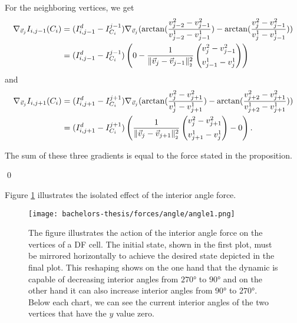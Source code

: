 \begin{proposition}
	For the neighboring vertices, we get 
	\begin{align*}
		\nabla_{\vec{v}_j}  I_{i, j-1}(C_i) 
		&= (I_{i, j-1}^d - I^{j-1}_{C_i}) \nabla_{\vec{v}_j} (\arctan(\frac{v_{j-2}^2 - v_{j-1}^2}{v_{j-2}^1 - v_{j-1}^1}) - \arctan(\frac{v_{j}^2 - v_{j-1}^2}{v_{j}^1 - v_{j-1}^1})) \\
		&= (I_{i, j-1}^d - I^{j-1}_{C_i}) \left( 0
		  - \frac{1}{\norm[\vec{v}_{j} - \vec{v}_{j-1}]^2} \begin{pmatrix}
			v_{j}^2 - v_{j-1}^2 \\[0.5em]
			v_{j-1}^1 - v_{j}^1
		\end{pmatrix} 
		\right) 
	\end{align*}
	and 
	\begin{align*}
		\nabla_{\vec{v}_j}  I_{i, j+1}(C_i) 
		&= (I_{i, j+1}^d - I^{j+1}_{C_i}) \nabla_{\vec{v}_j} (\arctan(\frac{v_{j}^2 - v_{j+1}^2}{v_{j}^1 - v_{j+1}^1}) - \arctan(\frac{v_{j+2}^2 - v_{j+1}^2}{v_{j+2}^1 - v_{j+1}^1})) \\
		&= (I_{i, j+1}^d - I^{j+1}_{C_i}) \left( \frac{1}{\norm[\vec{v}_{j} - \vec{v}_{j+1}]^2} \begin{pmatrix}
			v_{j}^2 - v_{j+1}^2 \\[0.5em]
			v_{j+1}^1 - v_{j}^1
		\end{pmatrix} 
		  - 0
		\right). 
	\end{align*}

	The sum of these three gradients is equal to the force stated in the proposition. 
	
	\qed
\end{proposition}


Figure \ref{fig:angleForce} illustrates the isolated effect of the interior angle force.

\begin{figure}
	\begin{center}
		\texttt{[image: bachelors-thesis/forces/angle/angle1.png]}
		\caption{The figure illustrates the action of the interior angle force on the vertices of a DF cell.
		The initial state, shown in the first plot, must be mirrored horizontally to achieve the desired state depicted in the final plot.
		This reshaping shows on the one hand that the dynamic is capable of decreasing interior angles from $270$° to $90$° and on the other hand it can also increase interior angles from $90$° to $270$°. 
		Below each chart, we can see the current interior angles of the two vertices that have the $y$ value zero. 
		}
		\label{fig:angleForce}
	\end{center}
\end{figure}








